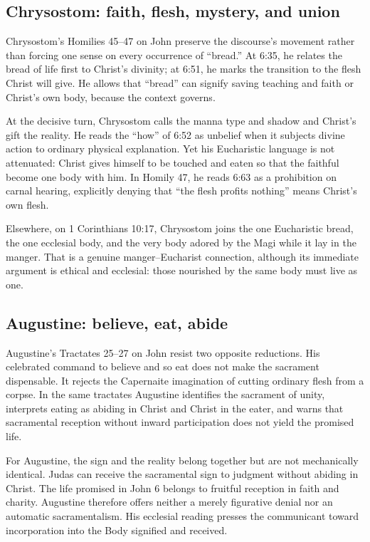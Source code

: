 \subsection{Chrysostom: faith, flesh, mystery, and union}

Chrysostom's Homilies 45--47 on John preserve the discourse's movement rather
than forcing one sense on every occurrence of ``bread.'' At 6:35, he relates
the bread of life first to Christ's divinity; at 6:51, he marks the transition
to the flesh Christ will give. He allows that ``bread'' can signify saving
teaching and faith or Christ's own body, because the context governs.

At the decisive turn, Chrysostom calls the manna type and shadow and Christ's
gift the reality. He reads the ``how'' of 6:52 as unbelief when it subjects
divine action to ordinary physical explanation. Yet his Eucharistic language
is not attenuated: Christ gives himself to be touched and eaten so that the
faithful become one body with him. In Homily 47, he reads 6:63 as a prohibition
on carnal hearing, explicitly denying that ``the flesh profits nothing'' means
Christ's own flesh.

Elsewhere, on 1 Corinthians 10:17, Chrysostom joins the one Eucharistic bread,
the one ecclesial body, and the very body adored by the Magi while it lay in the
manger. That is a genuine manger--Eucharist connection, although its immediate
argument is ethical and ecclesial: those nourished by the same body must live
as one.

\subsection{Augustine: believe, eat, abide}

Augustine's Tractates 25--27 on John resist two opposite reductions. His
celebrated command to believe and so eat does not make the sacrament
dispensable. It rejects the Capernaite imagination of cutting ordinary flesh
from a corpse. In the same tractates Augustine identifies the sacrament of
unity, interprets eating as abiding in Christ and Christ in the eater, and
warns that sacramental reception without inward participation does not yield
the promised life.

For Augustine, the sign and the reality belong together but are not
mechanically identical. Judas can receive the sacramental sign to judgment
without abiding in Christ. The life promised in John 6 belongs to fruitful
reception in faith and charity. Augustine therefore offers neither a merely
figurative denial nor an automatic sacramentalism. His ecclesial reading
presses the communicant toward incorporation into the Body signified and
received.

